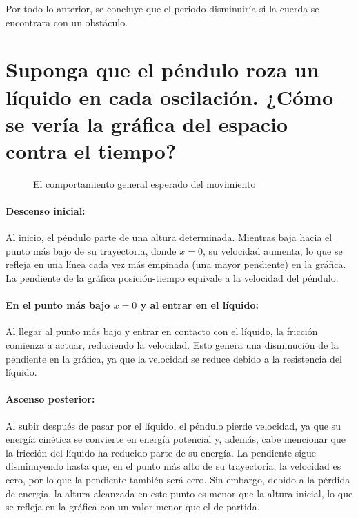 \documentclass[twocolumn]{report}
\numberwithin{table}{section}
\begin{document}
Por todo lo anterior, se concluye que el periodo disminuiría si la
cuerda se encontrara con un obstáculo.

\section{Suponga que el péndulo roza un líquido en cada
oscilación. ¿Cómo se vería la gráfica del espacio contra el tiempo?}

\begin{figure}[ht]
  \centering
  \caption{El comportamiento general esperado del
  movimiento}\label{fig:líquido}
\end{figure}

\paragraph{Descenso inicial:} Al inicio, el péndulo
parte de una altura determinada. Mientras baja hacia el punto más
bajo de su trayectoria, donde $x=0$, su velocidad aumenta, lo que se
refleja en una línea cada vez más empinada (una mayor pendiente)
en la gráfica. La pendiente de la gráfica posición-tiempo equivale a la
velocidad del péndulo.

\paragraph{En el punto más bajo $x=0$ y al entrar en el líquido:} Al llegar al
punto más bajo y entrar en contacto con el líquido, la fricción
comienza a actuar, reduciendo la velocidad. Esto genera una
disminución de la pendiente en la gráfica, ya que la velocidad se
reduce debido a la resistencia del líquido.

\paragraph{Ascenso posterior:} Al subir después de pasar por el líquido, el
péndulo pierde velocidad, ya que su energía cinética se
convierte en energía potencial y, además, cabe mencionar que la
fricción del líquido ha reducido parte de su energía. La pendiente
sigue disminuyendo hasta que, en el punto más alto de su trayectoria,
la velocidad es cero, por lo que la pendiente también será cero. Sin
embargo, debido a la pérdida de energía, la altura alcanzada en este
punto es menor que la altura inicial, lo que se refleja en la gráfica
con un valor menor que el de partida.
\end{document}
